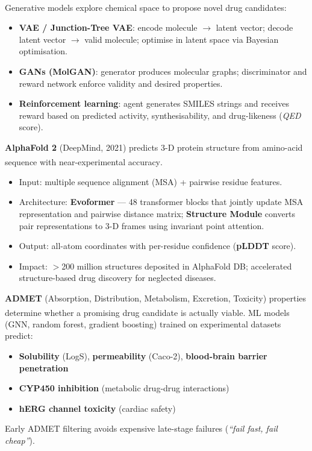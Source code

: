 \begin{tcbitemize}[ skin=sectionraster ]
    \tcbitem[title={Generative Molecular Design}, raster multicolumn=3]
    Generative models explore chemical space to propose novel drug candidates\textsuperscript{\cite[][pp.~90--120]{brownArtificialIntelligenceDrugDiscovery2020}}:
    \begin{itemize}
        \item \textbf{VAE / Junction-Tree VAE}: encode molecule $\to$ latent vector; decode latent vector $\to$ valid molecule; optimise in latent space via Bayesian optimisation.
        \item \textbf{GANs (MolGAN)}: generator produces molecular graphs; discriminator and reward network enforce validity and desired properties.
        \item \textbf{Reinforcement learning}: agent generates SMILES strings and receives reward based on predicted activity, synthesisability, and drug-likeness (\textit{QED} score).
    \end{itemize}

    \tcbitem[title={{AlphaFold: Protein Structure Prediction}}, raster multicolumn=6]
    \textbf{AlphaFold 2} (DeepMind, 2021) predicts 3-D protein structure from amino-acid sequence with near-experimental accuracy\textsuperscript{\cite[][p.~583]{jumperHighlyAccurateProtein2021}}.
    \begin{itemize}
        \item Input: multiple sequence alignment (MSA) + pairwise residue features.
        \item Architecture: \textbf{Evoformer} — 48 transformer blocks that jointly update MSA representation and pairwise distance matrix; \textbf{Structure Module} converts pair representations to 3-D frames using invariant point attention.
        \item Output: all-atom coordinates with per-residue confidence (\textbf{pLDDT} score).
        \item Impact: $>$200 million structures deposited in AlphaFold DB; accelerated structure-based drug discovery for neglected diseases.
    \end{itemize}

    \tcbitem[title={ADMET Prediction}, raster multicolumn=3]
    \textbf{ADMET} (Absorption, Distribution, Metabolism, Excretion, Toxicity) properties determine whether a promising drug candidate is actually viable\textsuperscript{\cite[][pp.~75--88]{blassDrugDiscoveryDevelopment2015}}.
    ML models (GNN, random forest, gradient boosting) trained on experimental datasets predict:
    \begin{itemize}
        \item \textbf{Solubility} (LogS), \textbf{permeability} (Caco-2), \textbf{blood-brain barrier penetration}
        \item \textbf{CYP450 inhibition} (metabolic drug-drug interactions)
        \item \textbf{hERG channel toxicity} (cardiac safety)
    \end{itemize}
    Early ADMET filtering avoids expensive late-stage failures (\textit{``fail fast, fail cheap''}).
\end{tcbitemize}

